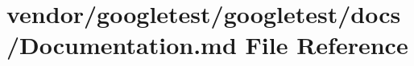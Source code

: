 \hypertarget{googletest_2docs_2_documentation_8md}{}\section{vendor/googletest/googletest/docs/\+Documentation.md File Reference}
\label{googletest_2docs_2_documentation_8md}
